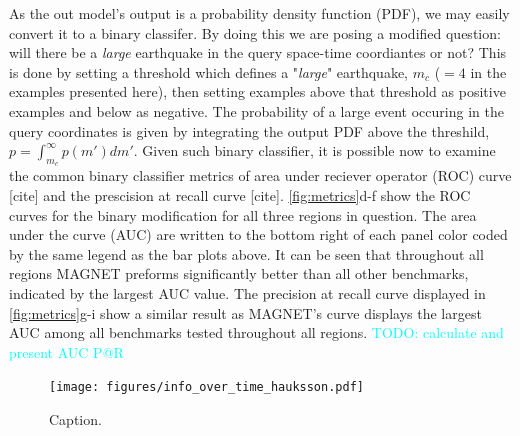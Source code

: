 \documentclass[pdflatex]{sn-jnl}
\newcommand{\neri}[1]{{\textcolor{cyan}{#1}}}
\begin{document}
As the out model's output is a probability density function (PDF), we may easily convert it to a binary classifer. By doing this we are posing a modified question: will there be a \textit{large} earthquake in the query space-time coordiantes or not? This is done by setting a threshold which defines a "\textit{large}" earthquake, $m_c$ ($=4$ in the examples presented here), then setting examples above that threshold as positive examples and below as negative. The probability of a large event occuring in the query coordinates is given by integrating the output PDF above the threshild, $p=\int_{m_c}^{\infty}p(m')dm'$. Given such binary classifier, it is possible now to examine the common binary classifier metrics of area under reciever operator (ROC) curve [cite] and the prescision at recall curve [cite]. \ref{fig:metrics}d-f show the ROC curves for the binary modification for all three regions in question. The area under the curve (AUC) are written to the bottom right of each panel color coded by the same legend as the bar plots above. It can be seen that throughout all regions MAGNET preforms significantly better than all other benchmarks, indicated by the largest AUC value. The precision at recall curve displayed in \ref{fig:metrics}g-i show a similar result as MAGNET's curve displays the largest AUC among all benchmarks tested throughout all regions.
\neri{TODO: calculate and present AUC P@R}

   
    
\begin{figure}[h!]
    \centering
    \texttt{[image: figures/info\_over\_time\_hauksson.pdf]}
    \caption{
        Caption.
    }
    \label{fig:info_gain_over_time}
\end{figure}
    
\end{document}
